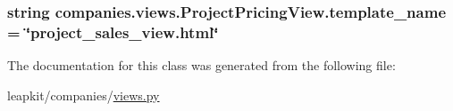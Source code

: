 \hypertarget{classcompanies_1_1views_1_1_project_pricing_view_aeca873db75628ed403d572965ab073e8}{
\subsubsection[{template\-\_\-name}]{\setlength{\rightskip}{0pt plus 5cm}string companies.\-views.\-Project\-Pricing\-View.\-template\-\_\-name = \char`\"{}project\-\_\-sales\-\_\-view.\-html\char`\"{}\hspace{0.3cm}{\ttfamily [static]}}}\label{classcompanies_1_1views_1_1_project_pricing_view_aeca873db75628ed403d572965ab073e8}


The documentation for this class was generated from the following file\-:\begin{DoxyCompactItemize}
\item 
leapkit/companies/\hyperlink{companies_2views_8py}{views.\-py}\end{DoxyCompactItemize}
